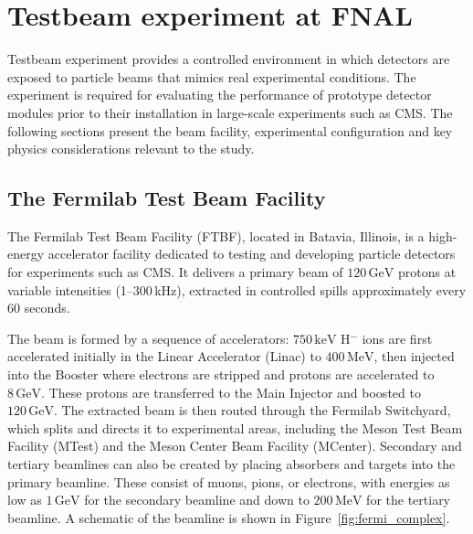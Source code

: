 \chapter{Testbeam experiment at FNAL}

Testbeam experiment provides a controlled environment in which detectors are exposed to particle beams that mimics real experimental conditions. The experiment is required for evaluating the performance of prototype detector modules prior to their installation in large-scale experiments such as CMS. The following sections present the beam facility, experimental configuration and key physics considerations relevant to the study.

\section{The Fermilab Test Beam Facility}

The Fermilab Test Beam Facility (FTBF), located in Batavia, Illinois, is a high-energy accelerator facility dedicated to testing and developing particle detectors for experiments such as CMS. It delivers a primary beam of $120\,\text{GeV}$ protons at variable intensities (1--300\,kHz), extracted in controlled spills approximately every 60 seconds.

The beam is formed by a sequence of accelerators: $750\,\text{keV}$ H$^-$ ions are first accelerated initially in the Linear Accelerator (Linac) to $400\,\text{MeV}$, then injected into the Booster where electrons are stripped and protons are accelerated to $8\,\text{GeV}$. These protons are transferred to the Main Injector and boosted to $120\,\text{GeV}$. The extracted beam is then routed through the Fermilab Switchyard, which splits and directs it to experimental areas, including the Meson Test Beam Facility (MTest) and the Meson Center Beam Facility (MCenter). Secondary and tertiary beamlines can also be created by placing absorbers and targets into the primary beamline. These consist of muons, pions, or electrons, with energies as low as $1\,\text{GeV}$ for the secondary beamline and down to $200\,\text{MeV}$ for the tertiary beamline. A schematic of the beamline is shown in Figure~\ref{fig:fermi_complex}.

